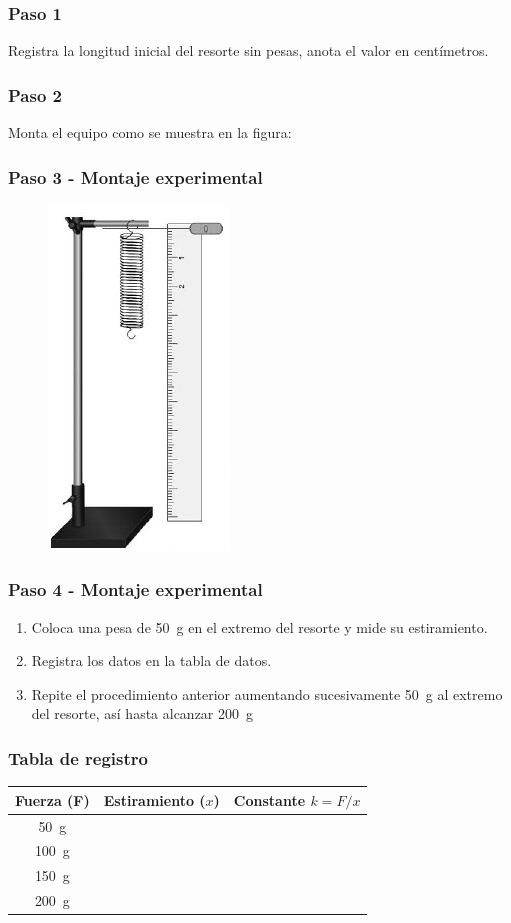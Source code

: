\documentclass[14pt]{beamer}
\begin{document}
\begin{frame}
\frametitle{Paso 1}
Registra la longitud inicial del resorte sin pesas, anota el valor en centímetros.
\end{frame}
\begin{frame}
\frametitle{Paso 2}
Monta el equipo como se muestra en la figura:
\end{frame}
\begin{frame}
\frametitle{Paso 3 - Montaje experimental}
\begin{figure}
    \centering
    \includegraphics[scale=0.6]{Imagenes/Practica_01_04.png}
\end{figure}
\end{frame}
\begin{frame}
\frametitle{Paso 4 - Montaje experimental}
\begin{enumerate}[<+->]
\item Coloca una pesa de \SI{50}{\gram} en el extremo del resorte y mide su estiramiento.
\item Registra los datos en la tabla de datos.
\item Repite el procedimiento anterior aumentando sucesivamente \SI{50}{\gram} al extremo del resorte, así hasta alcanzar \SI{200}{\gram}
\end{enumerate}
\end{frame}
\begin{frame}
\frametitle{Tabla de registro}
\begin{table}
\centering
\begin{tabular}{c | c | c}
Fuerza (\textbf{F}) & Estiramiento ($x$) & Constante $k = F / x$ \\ \hline
\SI{50}{\gram} & & \\ \hline
\SI{100}{\gram} & & \\ \hline
\SI{150}{\gram} & & \\ \hline
\SI{200}{\gram} & & \\ \hline
\end{tabular}
\end{table}
\end{frame}
\end{document}
